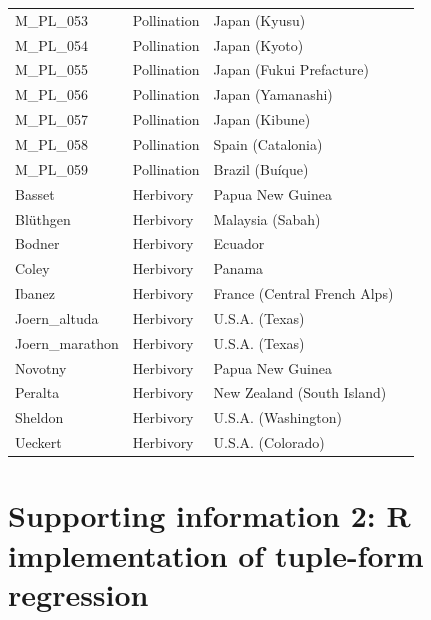\documentclass[12pt]{article}
\begin{document}
\begin{spacing}{1.5}
\begin{table}[h!]
\begin{center}
\begin{tabular}{|l l l m{6cm} |}
    M\_PL\_053  & Pollination & Japan (Kyusu) & \citet{Yamazaki2003}  \\
    M\_PL\_054  & Pollination & Japan (Kyoto) & \citet{Kakutani1990}  \\
    M\_PL\_055  & Pollination & Japan (Fukui Prefacture) & \citet{Kato1996}  \\
    M\_PL\_056  & Pollination & Japan (Yamanashi) & \citet{Kato1993}  \\
    M\_PL\_057  & Pollination & Japan (Kibune) & \citet{Inoue1990} \\
    M\_PL\_058  & Pollination & Spain (Catalonia) & \citet{Bartomeus2008} \\
    M\_PL\_059  & Pollination & Brazil (Bu\'{i}que) & \citet{Bezerra2009} \\
    Basset  & Herbivory & Papua New Guinea & \citet{Basset1996}  \\
    Bl\"{u}thgen  & Herbivory & Malaysia (Sabah) & \citet{Bluthgen2006a}  \\
    Bodner  & Herbivory & Ecuador & \citet{Bodner2010}  \\
    Coley & Herbivory & Panama & \citet{Coley2006} \\
    Ibanez  & Herbivory & France (Central French Alps) & \citet{Ibanez2013}  \\
    Joern\_altuda  & Herbivory & U.S.A. (Texas) & \citet{Joern1979} \\
    Joern\_marathon  & Herbivory & U.S.A. (Texas) & \citet{Joern1979} \\
    Novotny & Herbivory & Papua New Guinea & \citet{Novotny2012} \\
    Peralta & Herbivory & New Zealand (South Island) & \citet{Peralta2016} \\
    Sheldon & Herbivory & U.S.A. (Washington) & \citet{Sheldon1978} \\
    Ueckert & Herbivory & U.S.A. (Colorado) & \citet{Ueckert1971} \\
    \hline
    \end{tabular}
    \end{center}
    \end{table}
\clearpage
\newpage

\section*{Supporting information 2: R implementation of tuple-form regression}


\end{spacing}
\end{document}
